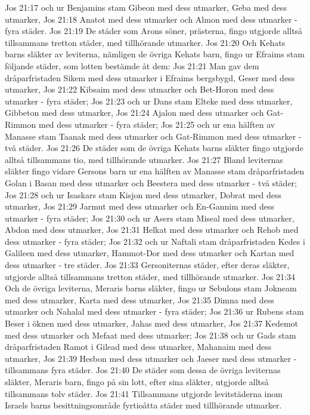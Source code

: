 Jos 21:17  och ur Benjamins stam Gibeon med dess utmarker, Geba med dess utmarker,
Jos 21:18  Anatot med dess utmarker och Almon med dess utmarker - fyra städer.
Jos 21:19  De städer som Arons söner, prästerna, fingo utgjorde alltså tillsammans tretton städer, med tillhörande utmarker.
Jos 21:20  Och Kehats barns släkter av leviterna, nämligen de övriga Kehats barn, fingo ur Efraims stam följande städer, som lotten bestämde åt dem:
Jos 21:21  Man gav dem dråparfristaden Sikem med dess utmarker i Efraims bergsbygd, Geser med dess utmarker,
Jos 21:22  Kibsaim med dess utmarker och Bet-Horon med dess utmarker - fyra städer;
Jos 21:23  och ur Dans stam Elteke med dess utmarker, Gibbeton med dess utmarker,
Jos 21:24  Ajalon med dess utmarker och Gat-Rimmon med dess utmarker - fyra städer;
Jos 21:25  och ur ena hälften av Manasse stam Taanak med dess utmarker och Gat-Rimmon med dess utmarker - två städer.
Jos 21:26  De städer som de övriga Kehats barns släkter fingo utgjorde alltså tillsammans tio, med tillhörande utmarker.
Jos 21:27  Bland leviternas släkter fingo vidare Gersons barn ur ena hälften av Manasse stam dråparfristaden Golan i Basan med dess utmarker och Beestera med dess utmarker - två städer;
Jos 21:28  och ur Isaskars stam Kisjon med dess utmarker, Dobrat med dess utmarker,
Jos 21:29  Jarmut med dess utmarker och En-Gannim med dess utmarker - fyra städer;
Jos 21:30  och ur Asers stam Miseal med dess utmarker, Abdon med dess utmarker,
Jos 21:31  Helkat med dess utmarker och Rehob med dess utmarker - fyra städer;
Jos 21:32  och ur Naftali stam dråparfristaden Kedes i Galileen med dess utmarker, Hammot-Dor med dess utmarker och Kartan med dess utmarker - tre städer.
Jos 21:33  Gersoniternas städer, efter deras släkter, utgjorde alltså tillsammans tretton städer, med tillhörande utmarker.
Jos 21:34  Och de övriga leviterna, Meraris barns släkter, fingo ur Sebulons stam Jokneam med dess utmarker, Karta med dess utmarker,
Jos 21:35  Dimna med dess utmarker och Nahalal med dess utmarker - fyra städer;
Jos 21:36  ur Rubens stam Beser i öknen med dess utmarker, Jahas med dess utmarker,
Jos 21:37  Kedemot med dess utmarker och Mefaat med dess utmarker;
Jos 21:38  och ur Gads stam dråparfristaden Ramot i Gilead med dess utmarker, Mahanaim med dess utmarker,
Jos 21:39  Hesbon med dess utmarker och Jaeser med dess utmarker - tillsammans fyra städer.
Jos 21:40  De städer som dessa de övriga leviternas släkter, Meraris barn, fingo på sin lott, efter sina släkter, utgjorde alltså tillsammans tolv städer.
Jos 21:41  Tillsammans utgjorde levitstäderna inom Israels barns besittningsområde fyrtioåtta städer med tillhörande utmarker.
